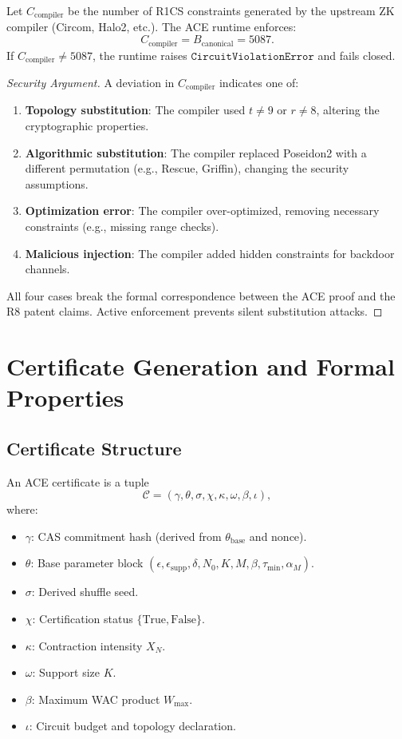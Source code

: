 \documentclass[11pt]{article}
\begin{document}
\begin{theorem}
Let $C_{\text{compiler}}$ be the number of R1CS constraints generated by the upstream ZK compiler (Circom, Halo2, etc.). The ACE runtime enforces:
\[
C_{\text{compiler}} = B_{\text{canonical}} = 5087.
\]
If $C_{\text{compiler}} \neq 5087$, the runtime raises $\texttt{CircuitViolationError}$ and fails closed.
\end{theorem}

\begin{proof}[Security Argument]
A deviation in $C_{\text{compiler}}$ indicates one of:
\begin{enumerate}
\item \textbf{Topology substitution}: The compiler used $t \neq 9$ or $r \neq 8$, altering the cryptographic properties.
\item \textbf{Algorithmic substitution}: The compiler replaced Poseidon2 with a different permutation (e.g., Rescue, Griffin), changing the security assumptions.
\item \textbf{Optimization error}: The compiler over-optimized, removing necessary constraints (e.g., missing range checks).
\item \textbf{Malicious injection}: The compiler added hidden constraints for backdoor channels.
\end{enumerate}
All four cases break the formal correspondence between the ACE proof and the R8 patent claims. Active enforcement prevents silent substitution attacks.
\end{proof}

\section{Certificate Generation and Formal Properties}

\subsection{Certificate Structure}

\begin{definition}[ACECertificate]
An ACE certificate is a tuple
\[
\mathcal{C} = (\gamma, \theta, \sigma, \chi, \kappa, \omega, \beta, \iota),
\]
where:
\begin{itemize}
\item $\gamma$: CAS commitment hash (derived from $\theta_{\text{base}}$ and nonce).
\item $\theta$: Base parameter block $(\epsilon, \epsilon_{\text{supp}}, \delta, N_0, K, M, \beta, \tau_{\min}, \alpha_M)$.
\item $\sigma$: Derived shuffle seed.
\item $\chi$: Certification status $\{\text{True}, \text{False}\}$.
\item $\kappa$: Contraction intensity $X_N$.
\item $\omega$: Support size $K$.
\item $\beta$: Maximum WAC product $W_{\max}$.
\item $\iota$: Circuit budget and topology declaration.
\end{itemize}
\end{definition}
\end{document}

